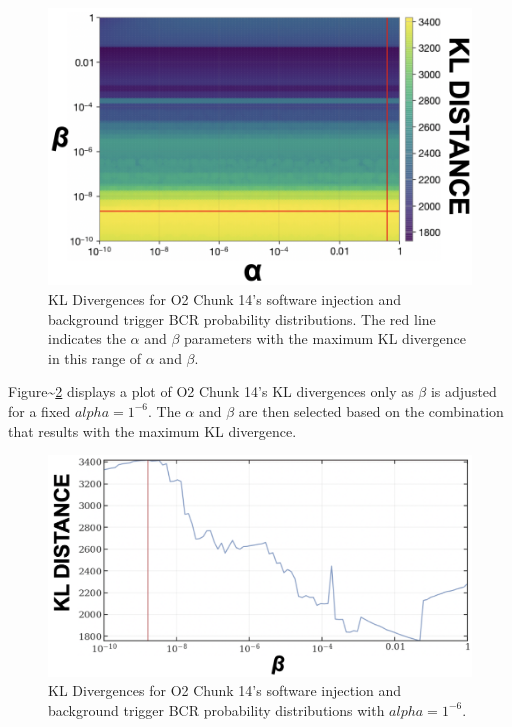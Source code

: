 \documentclass[%
 reprint,
 amsmath,amssymb,
 aps,
]{revtex4-2}
\begin{document}
\begin{figure}[!h]

{\centering \includegraphics[width=0.75\linewidth]{images/kl_divergence_grid} 

}

\caption[KL Divergence grid for both BCR tunable parameters]{KL Divergences for O2 Chunk 14's software injection and background trigger BCR probability distributions. The red line indicates the \(\alpha\) and \(\beta\) parameters with the maximum KL divergence in this range of \(\alpha\) and \(\beta\).}\label{fig:klDivGrid}
\end{figure}

Figure\textasciitilde\ref{fig:klDivLine} displays a plot of O2 Chunk 14's KL divergences only as
\(\beta\) is adjusted for a fixed \(alpha=1^{-6}\). The \(\alpha\) and \(\beta\) are then selected
based on the combination that results with the maximum KL divergence.



\begin{figure}[!h]

{\centering \includegraphics[width=0.75\linewidth]{images/kl_distance_14} 

}

\caption[KL Divergences for one BCR tunable parameter]{KL Divergences for O2 Chunk 14's software injection and background trigger BCR probability distributions with \(alpha=1^{-6}\).}\label{fig:klDivLine}
\end{figure}
\end{document}
